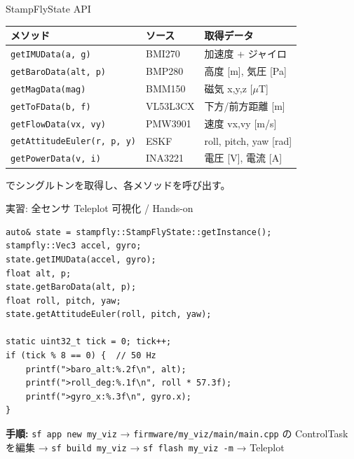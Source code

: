 \begin{frame}{StampFlyState API}
  {\small
  \begin{tabular}{lll}
    \hline
    \textbf{メソッド} & \textbf{ソース} & \textbf{取得データ} \\
    \hline
    \texttt{getIMUData(a, g)}           & BMI270          & 加速度 + ジャイロ \\
    \texttt{getBaroData(alt, p)}        & BMP280          & 高度 [m], 気圧 [Pa] \\
    \texttt{getMagData(mag)}            & BMM150          & 磁気 x,y,z [$\mu$T] \\
    \texttt{getToFData(b, f)}           & VL53L3CX        & 下方/前方距離 [m] \\
    \texttt{getFlowData(vx, vy)}        & PMW3901         & 速度 vx,vy [m/s] \\
    \texttt{getAttitudeEuler(r, p, y)}  & ESKF            & roll, pitch, yaw [rad] \\
    \texttt{getPowerData(v, i)}         & INA3221         & 電圧 [V], 電流 [A] \\
    \hline
  \end{tabular}
  }

  \vspace{0.5em}
  {\footnotesize
     でシングルトンを取得し、各メソッドを呼び出す。
  }
\end{frame}

\begin{frame}[fragile]{実習: 全センサ Teleplot 可視化 / Hands-on}
  \begin{lstlisting}[style=sfcpp, basicstyle=\ttfamily\scriptsize]
auto& state = stampfly::StampFlyState::getInstance();
stampfly::Vec3 accel, gyro;
state.getIMUData(accel, gyro);
float alt, p;
state.getBaroData(alt, p);
float roll, pitch, yaw;
state.getAttitudeEuler(roll, pitch, yaw);

static uint32_t tick = 0; tick++;
if (tick % 8 == 0) {  // 50 Hz
    printf(">baro_alt:%.2f\n", alt);
    printf(">roll_deg:%.1f\n", roll * 57.3f);
    printf(">gyro_x:%.3f\n", gyro.x);
}
  \end{lstlisting}

  {\footnotesize
    \textbf{手順:} \texttt{sf app new my\_viz} → \texttt{firmware/my\_viz/main/main.cpp} の
    ControlTask を編集 → \texttt{sf build my\_viz} → \texttt{sf flash my\_viz -m} → Teleplot
  }
\end{frame}


